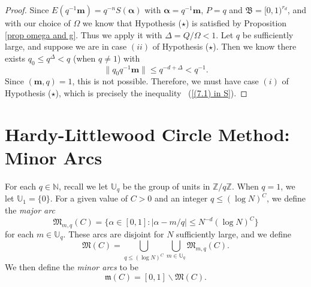 \documentclass[12pt]{amsart}
\theoremstyle{definition}
\theoremstyle{remark}
\numberwithin{equation}{section}
\begin{document}
\begin{proof}
Since $E(q^{-1} \mathbf{m} ) = q^{-n} S( \boldsymbol{\alpha} )$ with $\boldsymbol{\alpha}  = q^{-1} \mathbf{m}$, $P = q$ and $\mathfrak{B} = [0,1)^{r_d}$,
and with our choice of $\Omega$
we know that Hypothesis ($\star$) is satisfied by Proposition \ref{prop omega and g}. Thus we apply it with $\Delta = Q / \Omega < 1$. Let $q$ be sufficiently large, and suppose we are in case $(ii)$ of Hypothesis ($\star$). Then we know there
exists $q_0 \leq q^{\Delta} < q$ (when $q \not = 1$) with
$$
\|  q_0 q^{-1} \mathbf{m}  \| \leq q^{-d + \Delta} < q^{-1}.
$$
Since $(\mathbf{m}, q) = 1$, this is not possible.
Therefore, we must have case $(i)$ of Hypothesis ($\star$), which is precisely the inequality
~(\ref{(7.1) in S}).
\end{proof}

\section{Hardy-Littlewood Circle Method: Minor Arcs}
\label{section circle method}
\label{section minor arc}

For each $q \in \mathbb{N}$, recall we let $\mathbb{U}_q$ be the group of units in $\mathbb{Z}/ q \mathbb{Z}$. When $q=1$, we let $\mathbb{U}_1 = \{0\}$. For a given value of $C>0$ and an integer $q \leq (\log N)^C$, we define the \textit{major arc}
$$
\mathfrak{M}_{{m}, q}(C) = \{  {\alpha} \in [0,1] : | \alpha - m / q | \leq N^{-d} (\log N)^C  \}
$$
for each $m \in \mathbb{U}_q$. These arcs are disjoint for $N$ sufficiently large,
and we define
$$
\mathfrak{M}(C) = \bigcup_{q \leq (\log N)^C } \bigcup_{ {m} \in \mathbb{U}_q }  \mathfrak{M}_{{m}, q}(C).
$$
We then define the \textit{minor arcs} to be
$$
\mathfrak{m}(C) = [0,1] \backslash \mathfrak{M}(C).
$$
\end{document}
